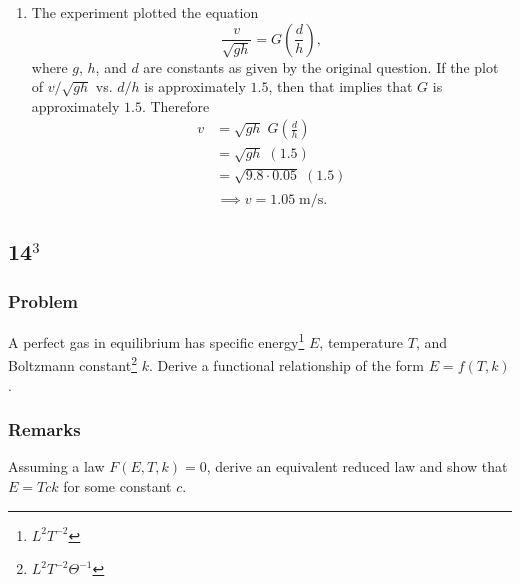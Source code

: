 \documentclass[12pt]{article}
\begin{document}
\begin{enumerate}
  \item The experiment plotted the equation
    \begin{equation*}
      \frac{v}{\sqrt{gh}} = G\left(\frac{d}{h}\right),
    \end{equation*}
    where $g$, $h$, and $d$ are constants as given by the original question. If
    the plot of $v/\sqrt{gh}$ vs. $d/h$ is approximately $1.5$, then that
    implies that $G$ is approximately $1.5$. Therefore
    \begin{equation*}
      \begin{aligned}
        v &= \sqrt{gh}\;G\left(\frac{d}{h}\right) \\
        &= \sqrt{gh}\;(1.5) \\
        &= \sqrt{9.8\cdot0.05}\;(1.5) \\
        \end{aligned}
    \end{equation*}
    \begin{equation*}
      \boxed{\implies v = 1.05\;\text{m/s}.}
    \end{equation*}
  \end{enumerate}

\newpage
\subsection{14$^3$}
  \subsubsection*{Problem}
  A perfect gas in equilibrium has specific energy\footnote{$L^2T^{-2}$} $E$,
  temperature $T$, and Boltzmann constant\footnote{$L^2T^{-2}\Theta^{-1}$} $k$.
  Derive a functional relationship of the form $E=f(T,k)$.

  \subsubsection*{Remarks}
  Assuming a law $F(E,T,k)=0$, derive an equivalent reduced law and show that
  $E=Tck$ for some constant $c$.
\end{document}
